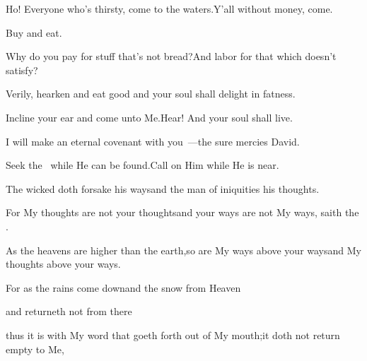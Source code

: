 
\begin{inparaenum}
  \pb{} Ho! Everyone who's thirsty, come to the waters.\pa{}Y'all without money, come.%

  \pb{}Buy and eat.%

  \pb{} Why do you pay for stuff that's not bread?\pa{}And labor for that which doesn't satisfy?%

  \pb{}Verily, hearken and eat good%
  \pa{}and your soul shall delight in fatness.%

  \pb{} Incline your ear and come unto Me.\pa{}Hear! And your soul shall live.%

  \pb{}I will make an eternal covenant with you~---\pa{}the sure mercies  David.%


  \pa{} Seek the \lord\ while He can be found.\pa{}Call on Him while He is near.%

  \pa{} The wicked doth forsake his ways\pa{}and the man of iniquities his thoughts.%

  \pa{} For My thoughts are not your thoughts\pa{}and your ways are not My ways, saith the \lord.%

  \pa{} As the heavens are higher than the earth,\pa{}so are My ways above your ways\pa{}and My thoughts above your ways.%

  \pa{} For as the rains come down\pa{}and the snow from Heaven%

  \pa{}and returneth not from there%

  \pa{} thus it is with My word that goeth forth out of My mouth;\pa{}it doth not return empty to Me,%


\end{inparaenum}
